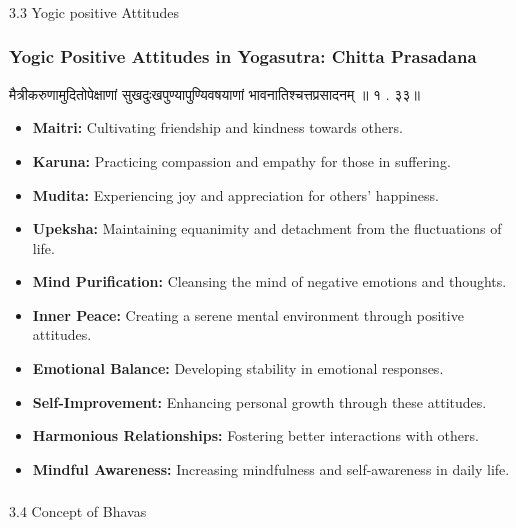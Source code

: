 \begin{frame}[fragile]\frametitle{}
\begin{center}
{\Large 3.3 Yogic positive Attitudes}
\end{center}
\end{frame}

\begin{frame}[fragile]\frametitle{Yogic Positive Attitudes in Yogasutra: Chitta Prasadana}

मैत्रीकरुणामुदितोपेक्षाणां सुखदुःखपुण्यापुण्यिवषयाणां भावनातिश्चत्तप्रसादनम् ॥   १ . ३३॥

      \begin{itemize}
        \item \textbf{Maitri:} Cultivating friendship and kindness towards others.
        \item \textbf{Karuna:} Practicing compassion and empathy for those in suffering.
        \item \textbf{Mudita:} Experiencing joy and appreciation for others' happiness.
        \item \textbf{Upeksha:} Maintaining equanimity and detachment from the fluctuations of life.
        \item \textbf{Mind Purification:} Cleansing the mind of negative emotions and thoughts.
        \item \textbf{Inner Peace:} Creating a serene mental environment through positive attitudes.
        \item \textbf{Emotional Balance:} Developing stability in emotional responses.
        \item \textbf{Self-Improvement:} Enhancing personal growth through these attitudes.
        \item \textbf{Harmonious Relationships:} Fostering better interactions with others.
        \item \textbf{Mindful Awareness:} Increasing mindfulness and self-awareness in daily life.
      \end{itemize}

\end{frame}

\begin{frame}[fragile]\frametitle{}
\begin{center}
{\Large 3.4 Concept of Bhavas}
\end{center}
\end{frame}

